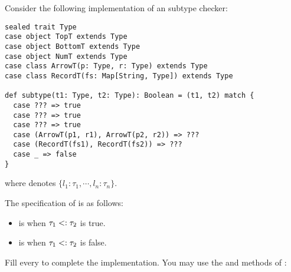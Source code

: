 \begin{exercise}

Consider the following implementation of an \lang subtype checker:

\begin{verbatim}
sealed trait Type
case object TopT extends Type
case object BottomT extends Type
case object NumT extends Type
case class ArrowT(p: Type, r: Type) extends Type
case class RecordT(fs: Map[String, Type]) extends Type

def subtype(t1: Type, t2: Type): Boolean = (t1, t2) match {
  case ??? => true
  case ??? => true
  case ??? => true
  case (ArrowT(p1, r1), ArrowT(p2, r2)) => ???
  case (RecordT(fs1), RecordT(fs2)) => ???
  case _ => false
}
\end{verbatim}

where 
denotes $\{l_1:\tau_1,\cdots,l_n:\tau_n\}$.

The specification of  is as follows:
\begin{itemize}
  \item {} is  when $\tau_1<:\tau_2$
    is true.
  \item {} is  when $\tau_1<:\tau_2$
    is false.
\end{itemize}

Fill every  to complete the implementation.  You may use the
and
methods of :

\end{exercise}

